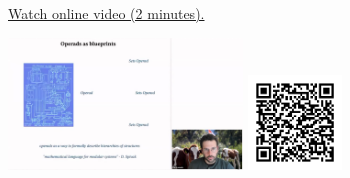 
\begin{minipage}{10cm}
    \href{https://act4e-spring21.netlify.app/videos/spring2021-operads-b:operad-blueprint.html}{Watch online video (2 minutes).}
        
    \href{https://act4e-spring21.netlify.app/videos/spring2021-operads-b:operad-blueprint.html}{\includegraphics[height=3.5cm]{spring2021-operads-b:operad-blueprint/thumbnails.jpg}}
    \href{https://act4e-spring21.netlify.app/videos/spring2021-operads-b:operad-blueprint.html}{\includegraphics[height=2.5cm]{spring2021-operads-b:operad-blueprint/qrcode.png}}
\end{minipage}
